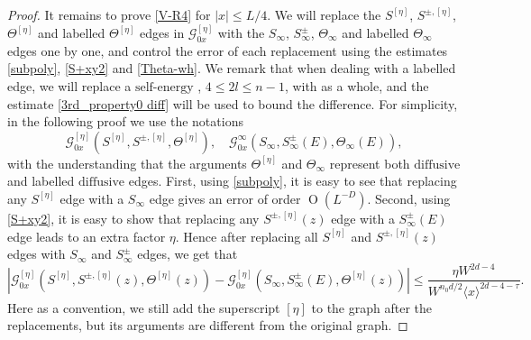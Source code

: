 \documentclass{article}
\newcommand{\1}{\mathds{1}}
\numberwithin{equation}{section}
\newcommand{\be}{\begin{equation}}
\newcommand{\ee}{\end{equation}}
\renewcommand{\cal}{\mathcal}
\newcommand{\ii}{\mathrm{i}} %
\renewcommand{\leq}{\leqslant}
\renewcommand{\le}{\leq}
\newcommand{\dashed}{\text{diffusive}}
\newcommand{\self}{\text{self-energy}}
\DeclareMathOperator{\OO}{O}
\theoremstyle{plain} %
\newtheorem{definition}[theorem]{Definition}
\theoremstyle{remark}
\newcommand{\Sele}{{\mathcal E}}
\begin{document}
\begin{proof}
It remains to prove \eqref{V-R4} for $|x| \le L/4$. We will replace the $S^{[\eta]}$, $S^{\pm,[\eta]}$, $\Theta^{[\eta]}$ and labelled $\Theta^{[\eta]}$ edges in ${\cal G}^{[\eta]}_{0x}$ with the $S_\infty$, $S_\infty^{\pm}$, $\Theta_\infty$ and labelled $\Theta_\infty$ edges one by one, and control the error of each replacement using the estimates \eqref{subpoly}, \eqref{S+xy2} and \eqref{Theta-wh}. We remark that when dealing with a labelled \smash{$\Theta^{[\eta]}$} edge, we will replace a $\self$ \smash{$\Sele_{2l}^{[\eta]}$}, $4\le 2l\le n-1$, with \smash{$\Sele_{2l}^{\infty}$} as a whole, and the estimate \eqref{3rd_property0 diff} will be used to bound the difference. For simplicity, in the following proof we use the notations
$$  {\cal G}^{[\eta]}_{0x}( S^{[\eta]}, S^{\pm,[\eta]},\Theta^{[\eta]}),\quad   \cal G^\infty_{0x}( S_\infty,  S_\infty^{\pm}(E), \Theta_\infty(E)),$$
with the understanding that the arguments $\Theta^{[\eta]}$ and $\Theta_\infty$ represent both $\dashed$ and labelled $\dashed$ edges. %
First, using \eqref{subpoly}, it is easy to see that replacing any $S^{[\eta]}$ edge with a $S_\infty$ edge gives an error of order $\OO(L^{-D})$. Second, using \eqref{S+xy2}, it is easy to show that replacing any $S^{\pm,[\eta]}(z)$ edge with a $S_\infty^{\pm}(E)$ edge leads to an extra factor $\eta$. Hence after replacing all $S^{[\eta]}$ and $S^{\pm,[\eta]}(z)$ edges with $S_\infty$ and $S_\infty^{\pm}$ edges, we get that 
$$\left|{\cal G}^{[\eta]}_{0x}(S^{[\eta]}, S^{\pm,[\eta]}(z),\Theta^{[\eta]}(z))-{\cal G}^{[\eta]}_{0x}( S_\infty,  S^{\pm}_\infty(E),\Theta^{[\eta]}(z))\right| \le \frac{ \eta W^{ 2d-4}}{ W^{ n_0d/2 }\langle x \rangle^{2d-4-\tau}}.$$
Here as a convention, we still add the superscript $[\eta]$ to the graph after the replacements, but its arguments are different from the original graph.

\end{proof}
\end{document}

